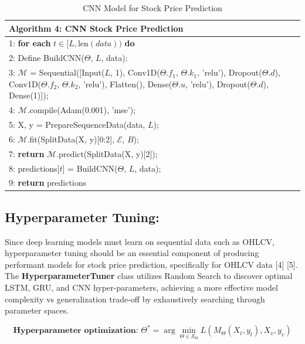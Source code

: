 \begin{itemize}
    \begin{table}[h]
    \tiny
    \centering
    \begin{tabular}{|p{10cm}|}
    \hline
    \textbf{Algorithm 4: CNN Stock Price Prediction} \\
    \hline
    1: \textbf{for each} $t \in [L, \text{len}(data))$ \textbf{do} \\
    2: \quad Define BuildCNN($\Theta$, $L$, data): \\
    3: \quad\quad $\mathcal{M}$ = Sequential([Input($L$, 1), Conv1D($\Theta.f_1$, $\Theta.k_1$, 'relu'), Dropout($\Theta.d$), Conv1D($\Theta.f_2$, $\Theta.k_2$, 'relu'), Flatten(), Dense($\Theta.u$, 'relu'), Dropout($\Theta.d$), Dense(1)]); \\
    4: \quad\quad $\mathcal{M}$.compile(Adam(0.001), 'mse'); \\
    5: \quad\quad X, y = PrepareSequenceData(data, $L$); \\
    6: \quad\quad $\mathcal{M}$.fit(SplitData(X, y)[0:2], $\mathcal{E}$, $B$); \\
    7: \quad\quad \textbf{return} $\mathcal{M}$.predict(SplitData(X, y)[2]); \\
    8: \quad predictions[$t$] = BuildCNN($\Theta$, $L$, data); \\
    9: \textbf{return} predictions \\
    \hline
    \end{tabular}
    \caption{CNN Model for Stock Price Prediction}
    \label{tab:cnn_predictor}
    \end{table}

\end{itemize}

\subsection{Hyperparameter Tuning: } Since deep learning models must learn on sequential data such as OHLCV, hyperparameter tuning should be an essential component of producing performant models for stock price prediction, specifically for OHLCV data [4] [5]. The \textbf{HyperparameterTuner} class utilizes Random Search to discover optimal LSTM, GRU, and CNN hyper-parameters, achieving a more effective model complexity vs generalization trade-off by exhaustively searching through parameter spaces.

\begin{equation}
\textbf{Hyperparameter optimization: } \Theta^* = \arg\min_{\Theta \in \mathcal{S}_\Theta} L(M_\Theta(X_t, y_t), X_v, y_v)
\label{math_hyperparameter_optimization}
\end{equation}

